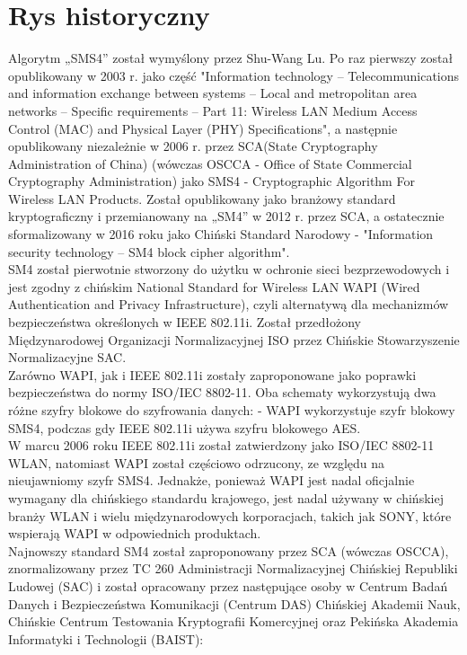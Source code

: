\section{Rys historyczny}

Algorytm „SMS4” został wymyślony przez Shu-Wang Lu. Po raz pierwszy został opublikowany w 2003 r. jako część 	"Information technology -- Telecommunications and information exchange between systems -- Local and metropolitan area networks -- Specific requirements -- Part 11: Wireless LAN Medium Access Control (MAC) and Physical Layer (PHY) Specifications", a następnie opublikowany niezależnie w 2006 r. przez SCA(State Cryptography Administration of China) (wówczas OSCCA - Office of State Commercial Cryptography Administration) jako SMS4 - Cryptographic Algorithm For Wireless LAN Products. Został opublikowany jako branżowy standard kryptograficzny i przemianowany na „SM4” w 2012 r. przez SCA, a ostatecznie sformalizowany w 2016 roku jako Chiński Standard Narodowy - "Information security technology -- SM4 block cipher algorithm".\\

SM4 został pierwotnie stworzony do użytku w ochronie sieci bezprzewodowych i jest zgodny z chińskim National Standard for Wireless LAN WAPI (Wired Authentication and Privacy Infrastructure), czyli alternatywą dla mechanizmów bezpieczeństwa określonych w IEEE 802.11i.
Został przedłożony Międzynarodowej Organizacji Normalizacyjnej ISO przez Chińskie Stowarzyszenie Normalizacyjne SAC. \\

Zarówno WAPI, jak i IEEE 802.11i zostały zaproponowane jako poprawki bezpieczeństwa do normy ISO/IEC 8802-11.
Oba schematy wykorzystują dwa różne szyfry blokowe do szyfrowania danych:
- WAPI wykorzystuje szyfr blokowy SMS4, podczas gdy IEEE 802.11i używa szyfru blokowego AES. \\

W marcu 2006 roku IEEE 802.11i został zatwierdzony jako ISO/IEC 8802-11 WLAN, natomiast WAPI został częściowo odrzucony, ze względu na nieujawniomy szyfr SMS4. Jednakże, ponieważ WAPI jest nadal oficjalnie wymagany dla chińskiego standardu krajowego,
jest nadal używany w chińskiej branży WLAN i wielu międzynarodowych
korporacjach, takich jak SONY, które wspierają WAPI w odpowiednich produktach. \\



Najnowszy standard SM4 został zaproponowany przez SCA (wówczas OSCCA), znormalizowany przez TC 260 Administracji Normalizacyjnej Chińskiej Republiki Ludowej (SAC) i został opracowany przez następujące osoby w Centrum Badań Danych i Bezpieczeństwa Komunikacji (Centrum DAS) Chińskiej Akademii Nauk, Chińskie Centrum Testowania Kryptografii Komercyjnej oraz Pekińska Akademia Informatyki i Technologii (BAIST):


